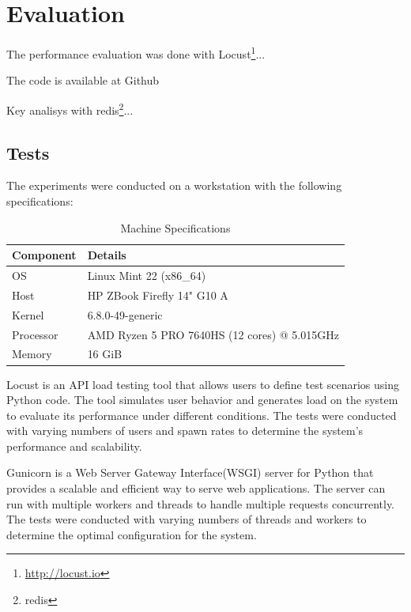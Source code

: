 \documentclass[cic,tc,english]{iiufrgs}
\begin{document}
\chapter{Evaluation}
    \label{chap:evaluation}
    The performance evaluation was done with Locust\footnote{\url{http://locust.io}}...

    The code is available at Github\citet{maabeflask}
    
    Key analisys with redis\footnote{redis}...

    \section{Tests}
        \label{sec:tests}

        The experiments were conducted on a workstation with the following specifications:

        \begin{table}[h]
            \centering
            \begin{tabular}{|l|l|}
            \hline
            \textbf{Component} & \textbf{Details} \\ \hline
            OS & Linux Mint 22 (x86\_64) \\ \hline
            Host & HP ZBook Firefly 14" G10 A \\ \hline
            Kernel & 6.8.0-49-generic \\ \hline
            Processor & AMD Ryzen 5 PRO 7640HS (12 cores) @ 5.015GHz \\ \hline
            Memory & 16 GiB \\ \hline
            \end{tabular}
            \caption{Machine Specifications}
            \label{tab:machine_specs}
        \end{table}

        Locust is an API load testing tool that allows users to define test scenarios using Python code. The tool simulates user behavior and generates load on the system to evaluate its performance under different conditions. The tests were conducted with varying numbers of users and spawn rates to determine the system's performance and scalability.
        
        Gunicorn is a Web Server Gateway Interface(WSGI) server for Python that provides a scalable and efficient way to serve web applications. The server can run with multiple workers and threads to handle multiple requests concurrently. The tests were conducted with varying numbers of threads and workers to determine the optimal configuration for the system.
\end{document}
